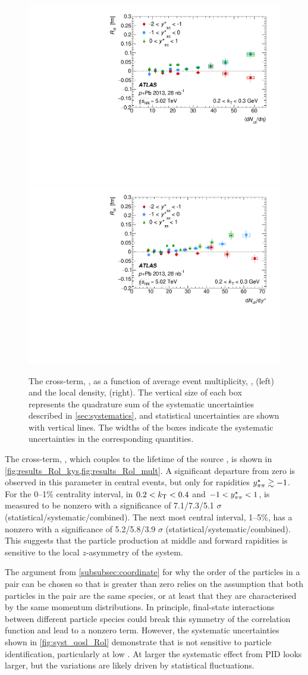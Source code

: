 \begin{figure}[t]
\centering
\includegraphics[width=0.49\linewidth]{canqosl_Rol_kt1_kys_vs_avg_mult.pdf}
\includegraphics[width=0.49\linewidth]{canqosl_Rol_kt1_vs_mult.pdf}
\caption{The cross-term, \Rol, as a function of average event multiplicity, \avgdNdeta, (left) and the local density, \dNdy (right). The vertical size of each box represents the quadrature sum of the systematic uncertainties described in \cref{sec:systematics}, and statistical uncertainties are shown with vertical lines. The widths of the boxes indicate the systematic uncertainties in the corresponding quantities.}
\label{fig:results_Rol_mult}
\end{figure}

The cross-term, \Rol, which couples to the lifetime of the source \cite{Chapman:1994yv}, is shown in \cref{fig:results_Rol_kys,fig:results_Rol_mult}.
A significant departure from zero is observed in this parameter in central events, but only for rapidities $y^{\star}_{\pi\pi} \gtrsim -1$.
For the 0--1\% centrality interval, in $ 0.2 < k_\mathrm{T} < 0.4$ and $-1 < y^{\star}_{\pi\pi} < 1$, \Rol is measured to be nonzero with a significance of 7.1/7.3/5.1 $\sigma$ (statistical/systematic/combined).
The next most central interval, 1--5\%, has a nonzero \Rol with a significance of 5.2/5.8/3.9 $\sigma$ (statistical/systematic/combined).
This suggests that the particle production at middle and forward rapidities is sensitive to the local $z$-asymmetry of the system.

The argument from \cref{subsubsec:coordinate} for why the order of the particles in a pair can be chosen so that \qout is greater than zero relies on the assumption that both particles in the pair are the same species, or at least that they are characterised by the same momentum distributions.
In principle, final-state interactions between different particle species could break this symmetry of the correlation function and lead to a nonzero \Rol term. 
However, the systematic uncertainties shown in \cref{fig:syst_qosl_Rol} demonstrate that \Rol is not sensitive to particle identification, particularly at low \kt.
At larger \kt the systematic effect from \ac{PID} looks larger, but the variations are likely driven by statistical fluctuations.

